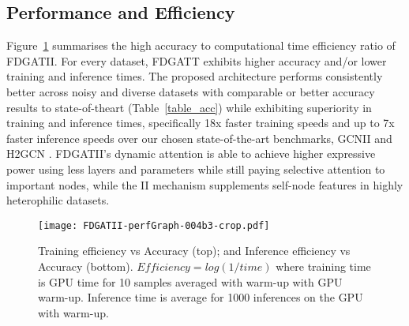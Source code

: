 \documentclass{article}
\begin{document}
\begin{table}[h]
\caption{Model layers and variant of II used for provided results. All other parameters are identical to \citet{chen2020simple}.}
\end{table}

\subsection{Performance and Efficiency}
Figure~\ref{fig_performance} summarises the high accuracy to computational time efficiency ratio of FDGATII. For every dataset, FDGATT exhibits higher accuracy and/or lower training and inference times.  The proposed architecture performs consistently better across noisy and diverse datasets with comparable or better accuracy results to state-of-theart (Table~\ref{table_acc}) while exhibiting superiority in training and inference times, specifically 18x faster training speeds and up to 7x faster inference speeds over our chosen state-of-the-art benchmarks, GCNII \cite{chen2020simple} and H2GCN \cite{zhu2020beyond}. FDGATII's dynamic attention is able to achieve higher expressive power using less layers and parameters while still paying selective attention to important nodes, while the II mechanism supplements self-node features in highly heterophilic datasets. 

\begin{figure}[h]
    \centering \texttt{[image: FDGATII-perfGraph-004b3-crop.pdf]}
\caption{Training efficiency vs Accuracy (top); and Inference efficiency vs Accuracy (bottom). $Efficiency = log(1/ time)$ where training time is GPU time for 10 samples averaged with warm-up with GPU warm-up. Inference time is average for 1000 inferences on the GPU with warm-up.}
    \label{fig_performance}
\end{figure}
\end{document}
